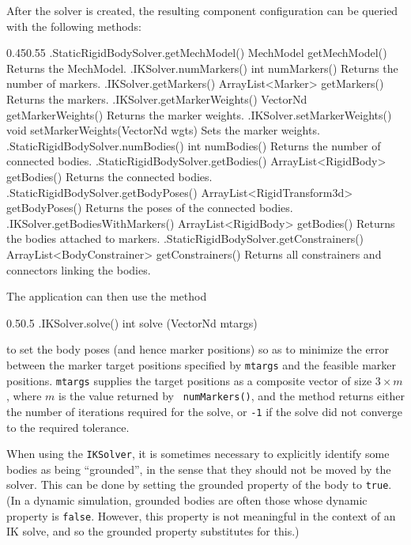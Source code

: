 After the solver is created, the resulting component configuration can be
queried with the following methods:
%
\begin{methodtable}{0.45}{0.55}
\midline
%
\methodentry
{\mech.StaticRigidBodySolver.getMechModel()}%
{MechModel getMechModel()}%
{Returns the MechModel.}%
%
\methodentry
{\probes.IKSolver.numMarkers()}%
{int numMarkers()}%
{Returns the number of markers.}%
%
\methodentry
{\probes.IKSolver.getMarkers()}%
{ArrayList<Marker> getMarkers()}%
{Returns the markers.}%
%
\methodentry
{\probes.IKSolver.getMarkerWeights()}%
{VectorNd getMarkerWeights()}%
{Returns the marker weights.}%
%
\methodentry
{\probes.IKSolver.setMarkerWeights()}%
{void setMarkerWeights(VectorNd wgts)}%
{Sets the marker weights.}%
%
\methodspace{0.5em}%
\methodentry
{\mech.StaticRigidBodySolver.numBodies()}%
{int numBodies()}%
{Returns the number of connected bodies.}%
%
\methodentry
{\mech.StaticRigidBodySolver.getBodies()}%
{ArrayList<RigidBody> getBodies()}%
{Returns the connected bodies.}%
%
\methodentry
{\mech.StaticRigidBodySolver.getBodyPoses()}%
{ArrayList<RigidTransform3d> getBodyPoses()}%
{Returns the poses of the connected bodies.}%
%
\methodentry
{\probes.IKSolver.getBodiesWithMarkers()}%
{ArrayList<RigidBody> getBodies()}%
{Returns the bodies attached to markers.}%
%
\methodspace{0.5em}%
\methodentry
{\mech.StaticRigidBodySolver.getConstrainers()}%
{ArrayList<BodyConstrainer> getConstrainers()}%
{Returns all constrainers and connectors linking the bodies.}%
%
\midline
\end{methodtable}
%

The application can then use the method
%
\begin{methodtable}{0.5}{0.5}
\methodentry
{\probes.IKSolver.solve()}%
{int solve (VectorNd mtargs)}%
{\ }%
%
\end{methodtable}
%
to set the body poses (and hence marker positions) so as to minimize the error
between the marker target positions specified by {\tt mtargs} and the feasible
marker positions.  {\tt mtargs} supplies the target positions as a composite
vector of size $3 \times m$, where $m$ is the value returned by {\tt
numMarkers()}, and the method returns either the number of iterations required
for the solve, or {\tt -1} if the solve did not converge to the required
tolerance.

\begin{sideblock}
When using the {\tt IKSolver}, it is sometimes necessary to explicitly identify
some bodies as being ``grounded'', in the sense that they should not be moved
by the solver. This can be done by setting the {\sf grounded} property of the
body to {\tt true}. (In a dynamic simulation, grounded bodies are often those
whose {\sf dynamic} property is {\tt false}. However, this property is not
meaningful in the context of an IK solve, and so the {\sf grounded} property
substitutes for this.)
\end{sideblock}

